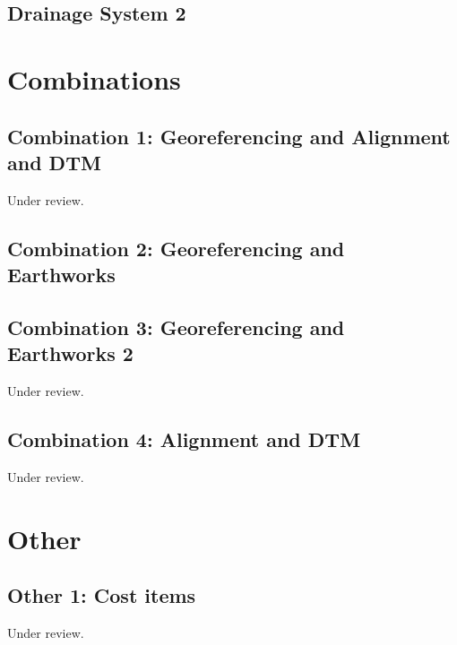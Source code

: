 \documentclass{scrartcl}
\begin{document}
\subsection{Drainage System 2}
\label{sec:drainage_2}
\clearpage

\section{Combinations}

\subsection{Combination 1: Georeferencing and Alignment and DTM}
\label{sec:align_dtm_1}
Under review.%
\clearpage

\subsection{Combination 2: Georeferencing and Earthworks}
\label{sec:georef_earth_1}
\clearpage

\subsection{Combination 3: Georeferencing and Earthworks 2}
\label{sec:georef_earth_2}
Under review.%
\clearpage

\subsection{Combination 4: Alignment and DTM}
\label{sec:align_dtm_2}
Under review.%
\clearpage

\section{Other}

\subsection{Other 1: Cost items}
\label{sec:other_1}
Under review.%
\clearpage
\end{document}
